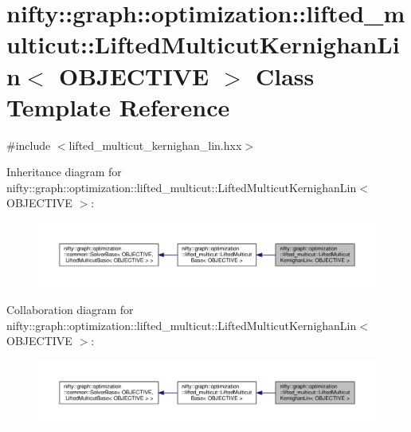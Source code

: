 \hypertarget{classnifty_1_1graph_1_1optimization_1_1lifted__multicut_1_1LiftedMulticutKernighanLin}{}\section{nifty\+:\+:graph\+:\+:optimization\+:\+:lifted\+\_\+multicut\+:\+:Lifted\+Multicut\+Kernighan\+Lin$<$ O\+B\+J\+E\+C\+T\+I\+V\+E $>$ Class Template Reference}
\label{classnifty_1_1graph_1_1optimization_1_1lifted__multicut_1_1LiftedMulticutKernighanLin}


{\ttfamily \#include $<$lifted\+\_\+multicut\+\_\+kernighan\+\_\+lin.\+hxx$>$}



Inheritance diagram for nifty\+:\+:graph\+:\+:optimization\+:\+:lifted\+\_\+multicut\+:\+:Lifted\+Multicut\+Kernighan\+Lin$<$ O\+B\+J\+E\+C\+T\+I\+V\+E $>$\+:\nopagebreak
\begin{figure}[H]
\begin{center}
\leavevmode
\includegraphics[width=350pt]{classnifty_1_1graph_1_1optimization_1_1lifted__multicut_1_1LiftedMulticutKernighanLin__inherit__graph}
\end{center}
\end{figure}


Collaboration diagram for nifty\+:\+:graph\+:\+:optimization\+:\+:lifted\+\_\+multicut\+:\+:Lifted\+Multicut\+Kernighan\+Lin$<$ O\+B\+J\+E\+C\+T\+I\+V\+E $>$\+:\nopagebreak
\begin{figure}[H]
\begin{center}
\leavevmode
\includegraphics[width=350pt]{classnifty_1_1graph_1_1optimization_1_1lifted__multicut_1_1LiftedMulticutKernighanLin__coll__graph}
\end{center}
\end{figure}
